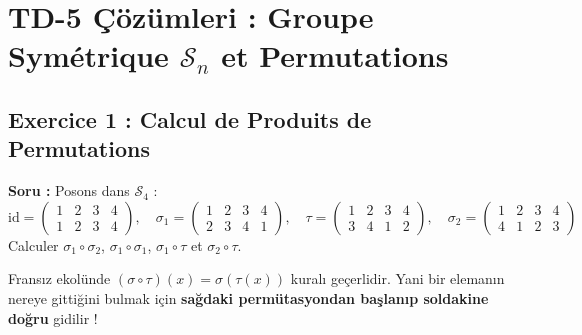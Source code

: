 \documentclass[12pt,a4paper]{report}
\begin{document}
\newpage
\section{TD-5 Çözümleri : Groupe Symétrique $\mathcal{S}_n$ et Permutations}

\subsection*{Exercice 1 : Calcul de Produits de Permutations}
\textbf{Soru :} Posons dans $\mathcal{S}_4$ :
\[
\mathrm{id} = \begin{pmatrix} 1 & 2 & 3 & 4 \\ 1 & 2 & 3 & 4 \end{pmatrix}, \quad 
\sigma_1 = \begin{pmatrix} 1 & 2 & 3 & 4 \\ 2 & 3 & 4 & 1 \end{pmatrix}, \quad 
\tau = \begin{pmatrix} 1 & 2 & 3 & 4 \\ 3 & 4 & 1 & 2 \end{pmatrix}, \quad 
\sigma_2 = \begin{pmatrix} 1 & 2 & 3 & 4 \\ 4 & 1 & 2 & 3 \end{pmatrix}
\]
Calculer $\sigma_1 \circ \sigma_2$, $\sigma_1 \circ \sigma_1$, $\sigma_1 \circ \tau$ et $\sigma_2 \circ \tau$.

\begin{tcolorbox}[colback=blue!5!white,colframe=blue!75!black,title=Rappel : Bileşke Sırası (Convention Française)]
Fransız ekolünde $(\sigma \circ \tau)(x) = \sigma(\tau(x))$ kuralı geçerlidir. Yani bir elemanın nereye gittiğini bulmak için \textbf{sağdaki permütasyondan başlanıp soldakine doğru} gidilir !
\end{tcolorbox}
\end{document}

